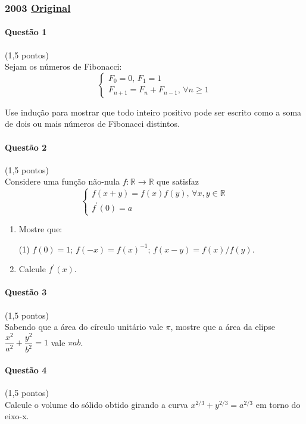 \documentclass[12pt,a4paper]{article}
\newcommand{\R}{\mathbb{R}}
\newcommand{\original}[1]{\tiny \href{#1}{Original} \normalsize}
\begin{document}
\newpage
\subsubsection{2003 \original{https://drive.google.com/open?id=1RAoouERZSL2CNv6vJkks5gfHAwLBubP7}}
\footnotesize{
\begin{multicols}{2}\setlength{\columnsep}{1.5cm}
\setlength{\columnseprule}{0.2pt}
\paragraph{Questão 1} (1,5 pontos)\\
Sejam os números de Fibonacci:
$$\begin{cases}F_0 = 0,\, F_1 = 1 \\ F_{n+1}=F_n + F_{n-1},\, \forall n \ge 1 \end{cases}$$

Use indução para mostrar que todo inteiro positivo pode ser escrito como a soma de dois ou mais números de Fibonacci distintos.

\paragraph{Questão 2} (1,5 pontos)\\
Considere uma função não-nula $f: \R \to \R$ que satisfaz 
$$\begin{cases}
f(x+y) = f(x)f(y),\,\forall x,y \in \R
\\f^{\prime}(0) = a
\end{cases}$$

\begin{enumerate}[label=(\roman*)]
\item Mostre que:
\begin{tasks}(1)
\task $f(0) = 1$;
\task $f(-x) = f(x)^{-1}$;
\task $f(x-y) = f(x)/f(y)$.
\end{tasks} 
\item Calcule $f^{\prime}(x)$.
\end{enumerate}

\paragraph{Questão 3} (1,5 pontos)\\
Sabendo que a área do círculo unitário vale $\pi$, mostre que a área da elipse $\dfrac{x^2}{a^2}+\dfrac{y^2}{b^2} = 1$ vale $\pi a b$.

\paragraph{Questão 4} (1,5 pontos)\\
Calcule o volume do sólido obtido girando a curva $x^{2/3}+y^{2/3} = a^{2/3}$ em torno do eixo-x.


\end{multicols}}
\end{document}
